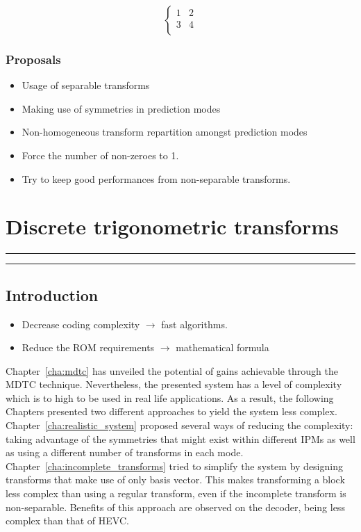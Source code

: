 \documentclass[11pt,a4paper,openright,twoside]{book}
\providecommand{\chaptertoc}{
	\startcontents[chapters]
	\hrule
	\vspace{1em}
	\printcontents[chapters]{}{1}{{\bf\large Contents}}
	\hrule
}
\numberwithin{equation}{section} %
\numberwithin{figure}{section} %
\numberwithin{table}{section} %
\begin{document}
\begin{equation}
	\begin{cases}
		1 & 2\\
		3 & 4\\
	\end{cases}
\end{equation}

\subsection{Proposals}
\label{sub:proposals}

\begin{itemize}
	\item Usage of separable transforms
	\item Making use of symmetries in prediction modes
	\item Non-homogeneous transform repartition amongst prediction modes
\end{itemize}

\begin{itemize}
	\item Force the number of non-zeroes to 1.
	\item Try to keep good performances from non-separable transforms.
\end{itemize}

\chapter{Discrete trigonometric transforms}
\label{cha:discrete_trigonometric_transforms}
\chaptertoc

\section{Introduction}
\label{sec:introduction}

\begin{itemize}
	\item Decrease coding complexity $\rightarrow$ fast algorithms.
	\item Reduce the ROM requirements $\rightarrow$ mathematical formula
\end{itemize}

Chapter~\ref{cha:mdtc} has unveiled the potential of gains achievable through
the \ac{MDTC} technique.
Nevertheless, the presented system has a level of complexity which is to
high to be used in real life applications.
As a result, the following Chapters presented two different approaches to
yield the system less complex.
Chapter~\ref{cha:realistic_system} proposed several ways of reducing the
complexity: taking advantage of the symmetries that might exist within
different \acp{IPM} as well as using a different number of transforms in each
mode.
Chapter~\ref{cha:incomplete_transforms} tried to simplify the system by
designing transforms that make use of only basis vector.
This makes transforming a block less complex than using a regular transform,
even if the incomplete transform is non-separable.
Benefits of this approach are observed on the decoder, being less complex than
that of \ac{HEVC}.
\end{document}
